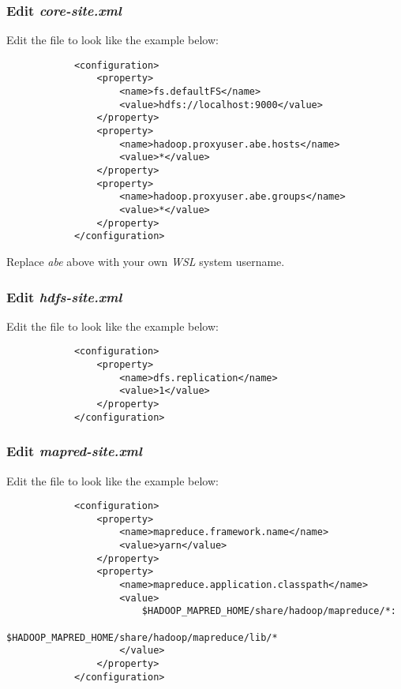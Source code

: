 \documentclass{article}
\begin{document}
        \subsubsection{Edit \emph{core-site.xml}}
        Edit the file  to look like the example below:
        \begin{verbatim}
            <configuration>
                <property>
                    <name>fs.defaultFS</name>
                    <value>hdfs://localhost:9000</value>
                </property>
                <property>
                    <name>hadoop.proxyuser.abe.hosts</name>
                    <value>*</value>
                </property>
                <property>
                    <name>hadoop.proxyuser.abe.groups</name>
                    <value>*</value>
                </property>
            </configuration>
        \end{verbatim}
        Replace \emph{abe} above with your own \emph{WSL} system username.

        \subsubsection{Edit \emph{hdfs-site.xml}}
        Edit the file  to look like the example below:
        \begin{verbatim}
            <configuration>
                <property>
                    <name>dfs.replication</name>
                    <value>1</value>
                </property>
            </configuration>
        \end{verbatim}
        
        \subsubsection{Edit \emph{mapred-site.xml}}
        Edit the file  to look like the example below:
        \begin{verbatim}
            <configuration>
                <property>
                    <name>mapreduce.framework.name</name>
                    <value>yarn</value>
                </property>
                <property>
                    <name>mapreduce.application.classpath</name>
                    <value>
                        $HADOOP_MAPRED_HOME/share/hadoop/mapreduce/*:
                        $HADOOP_MAPRED_HOME/share/hadoop/mapreduce/lib/*
                    </value>
                </property>
            </configuration>
        \end{verbatim}
        
\end{document}

